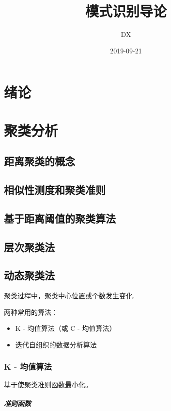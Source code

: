 \documentclass[11pt]{book}
\begin{document}
\title{模式识别导论}
\author{DX}
\date{2019-09-21}

\chapter{绪论}

\chapter{聚类分析}

\section{距离聚类的概念}

\section{相似性测度和聚类准则}

\section{基于距离阈值的聚类算法}

\section{层次聚类法}

\section{动态聚类法}

聚类过程中，聚类中心位置或个数发生变化.

两种常用的算法：
\begin{itemize}
	\item K - 均值算法（或 C - 均值算法）
	\item 迭代自组织的数据分析算法
\end{itemize}

\subsection{K - 均值算法}%

基于使聚类准则函数最小化。

\paragraph{准则函数}%
\label{par:zhun_ze_han_shu_}
\end{document}
